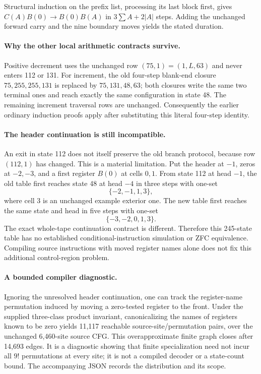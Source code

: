 Structural induction on the prefix list, processing its last block first,
gives $C(A)B(0)\longrightarrow B(0)B(A)$ in
$3\sum A+2|A|$ steps. Adding the unchanged forward carry and the nine
boundary moves yields the stated duration.

\paragraph{Why the other local arithmetic contracts survive.}
Positive decrement uses the unchanged row $(75,1)=(1,L,63)$ and never enters
112 or 131. For increment, the old four-step blank-end closure
$75,255,255,131$ is replaced by $75,131,48,63$; both closures write the same
two terminal ones and reach exactly the same configuration in state 48.
The remaining increment traversal rows are unchanged. Consequently the
earlier ordinary induction proofs apply after substituting this literal
four-step identity.

\paragraph{The header continuation is still incompatible.}
An exit in state 112 does not itself preserve the old branch protocol,
because row $(112,1)$ has changed. This is a material limitation. Put the
header at $-1$, zeros at $-2,-3$, and a first register $B(0)$ at cells
$0,1$. From state 112 at head $-1$, the old table first reaches state 48
at head $-4$ in three steps with one-set
\[
 \{-2,-1,1,3\},
\]
where cell 3 is an unchanged example exterior one. The new table first
reaches the same state and head in five steps with one-set
\[
 \{-3,-2,0,1,3\}.
\]
The exact whole-tape continuation contract is different. Therefore this
245-state table has no established conditional-instruction simulation or
ZFC equivalence. Compiling source instructions with moved register names
alone does not fix this additional control-region problem.

\paragraph{A bounded compiler diagnostic.}
Ignoring the unresolved header continuation, one can track the register-name
permutation induced by moving a zero-tested register to the front. Under
the supplied three-class product invariant, canonicalizing the names of
registers known to be zero yields 11,117 reachable source-site/permutation
pairs, over the unchanged 6,460-site source CFG. This overapproximate finite
graph closes after 14,693 edges. It is a diagnostic showing that finite
specialization need not incur all $9!$ permutations at every site; it is
not a compiled decoder or a state-count bound. The accompanying JSON records
the distribution and its scope.


